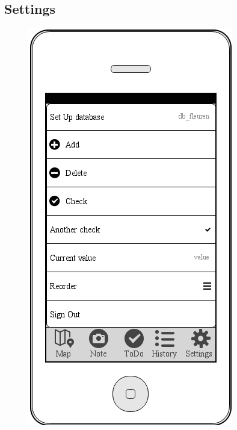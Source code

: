\documentclass[12pt]{article}
\begin{document}
\subsection{Settings}
\begin{figure}[ht]
	\centering
	\includegraphics[width=\linewidth, height=0.4\textheight, keepaspectratio=true]{screenshots/Settings.png}

\end{figure}
\end{document}
